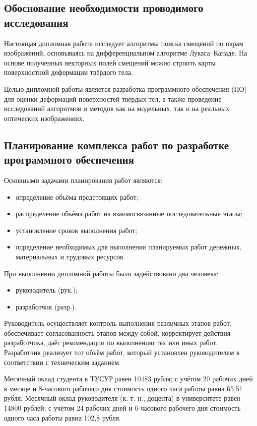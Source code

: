 \subsection{Обоснование необходимости проводимого исследования}
Настоящая дипломная работа исследует алгоритмы поиска смещений по парам изображений, основываясь на дифференциальном алгоритме Лукаса--Канаде. На основе полученных векторных полей смещений можно строить карты поверхностной деформации твёрдого тела.

Целью дипломной работы является разработка программного обеспечения (ПО) для оценки деформаций поверхностей твёрдых тел, а также проведение исследований алгоритмов и методов как на модельных, так и на реальных оптических изображениях.

\subsection{Планирование комплекса работ по разработке программного обеспечения}
Основными задачами планирования работ являются:

\begin{itemize}
\item определение объёма предстоящих работ;
\item распределение объёма работ на взаимосвязанные последовательные этапы;
\item установление сроков выполнения работ;
\item определение необходимых для выполнения планируемых работ денежных, материальных и трудовых ресурсов.
\end{itemize}
При выполнении дипломной работы было задействовано два человека:

\begin{itemize}
\item руководитель (рук.);
\item разработчик (разр.).
\end{itemize}

Руководитель осуществляет контроль выполнения различных этапов работ, обеспечивает согласованность этапов между собой, корректирует действия разработчика, даёт рекомендации по выполнению тех или иных работ. Разработчик реализует тот объём работ, который установлен руководителем в соответствии с техническим заданием.

Месячный оклад студента в ТУСУР равен 10483 рубля; с учётом 20 рабочих дней в месяце и 8-часового рабочего дня стоимость одного часа работы равна 65{,}51 рубля. Месячный оклад руководителя (к. т. н., доцента) в университете равен 14800 рублей; с учётом 24 рабочих дней и 6-часового рабочего дня стоимость одного часа работы равна 102{,}8 рубля.

